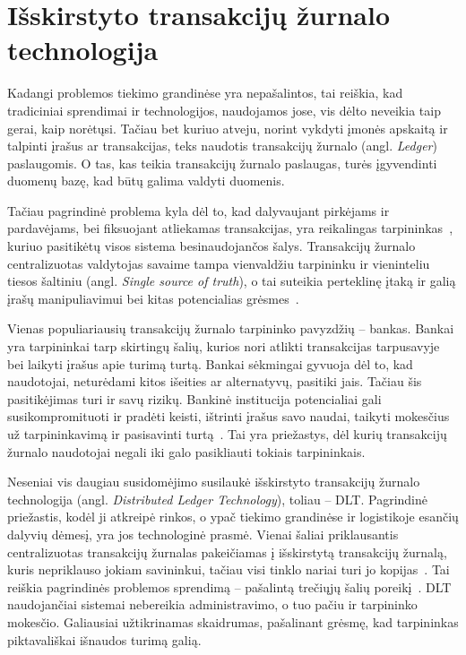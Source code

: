 
\section {Išskirstyto transakcijų žurnalo technologija} \label{section:dlt}

Kadangi problemos tiekimo grandinėse yra nepašalintos, tai reiškia, kad tradiciniai sprendimai ir technologijos, naudojamos jose, vis dėlto neveikia taip gerai, kaip norėtųsi. Tačiau bet kuriuo atveju, norint vykdyti įmonės apskaitą ir talpinti įrašus ar transakcijas, teks naudotis transakcijų žurnalo (angl. \textit{Ledger}) paslaugomis. O tas, kas teikia transakcijų žurnalo paslaugas, turės įgyvendinti duomenų bazę, kad būtų galima valdyti duomenis.

Tačiau pagrindinė problema kyla dėl to, kad dalyvaujant pirkėjams ir pardavėjams, bei fiksuojant atliekamas transakcijas, yra reikalingas tarpininkas~\cite{gao2018coc}, kuriuo pasitikėtų visos sistema besinaudojančos šalys. Transakcijų žurnalo centralizuotas valdytojas savaime tampa vienvaldžiu tarpininku ir vieninteliu tiesos šaltiniu (angl. \textit{Single source of truth}), o tai suteikia perteklinę įtaką ir galią įrašų manipuliavimui bei kitas potencialias grėsmes~\cite{jiang2017much, shyamasundar2018blockchain}. 

Vienas populiariausių transakcijų žurnalo tarpininko pavyzdžių – bankas. Bankai yra tarpininkai tarp skirtingų šalių, kurios nori atlikti transakcijas tarpusavyje bei laikyti įrašus apie turimą turtą. Bankai sėkmingai gyvuoja dėl to, kad naudotojai, neturėdami kitos išeities ar alternatyvų, pasitiki jais. Tačiau šis pasitikėjimas turi ir savų rizikų. Bankinė institucija potencialiai gali susikompromituoti ir pradėti keisti, ištrinti įrašus savo naudai, taikyti mokesčius už tarpininkavimą ir pasisavinti turtą~\cite{shyamasundar2018blockchain}. Tai yra priežastys, dėl kurių transakcijų žurnalo naudotojai negali iki galo pasikliauti tokiais tarpininkais.

Neseniai vis daugiau susidomėjimo susilaukė išskirstyto transakcijų žurnalo technologija (angl. \textit{Distributed Ledger Technology}), toliau – DLT. Pagrindinė priežastis, kodėl ji atkreipė rinkos, o ypač tiekimo grandinėse ir logistikoje esančių dalyvių dėmesį, yra jos technologinė prasmė. Vienai šaliai priklausantis centralizuotas transakcijų žurnalas pakeičiamas į išskirstytą transakcijų žurnalą, kuris nepriklauso jokiam savininkui, tačiau visi tinklo nariai turi jo kopijas~\cite{shyamasundar2018blockchain}. Tai reiškia pagrindinės problemos sprendimą – pašalintą trečiųjų šalių poreikį~\cite{shyamasundar2018blockchain}. DLT naudojančiai sistemai nebereikia administravimo, o tuo pačiu ir tarpininko mokesčio. Galiausiai užtikrinamas skaidrumas, pašalinant grėsmę, kad tarpininkas piktavališkai išnaudos turimą galią.



